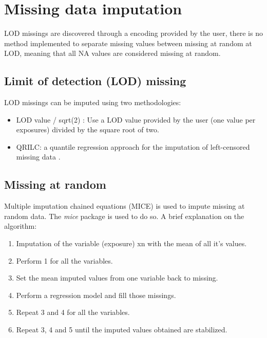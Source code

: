 \documentclass[
]{book}
\providecommand{\tightlist}{%
  \setlength{\itemsep}{0pt}\setlength{\parskip}{0pt}}
\begin{document}
\hypertarget{missing-data-imputation}{%
\section{Missing data imputation}\label{missing-data-imputation}}

LOD missings are discovered through a encoding provided by the user, there is no method implemented to separate missing values between missing at random at LOD, meaning that all NA values are considered missing at random.

\hypertarget{limit-of-detection-lod-missing}{%
\subsection{Limit of detection (LOD) missing}\label{limit-of-detection-lod-missing}}

LOD missings can be imputed using two methodologies:

\begin{itemize}
\tightlist
\item
  LOD value / sqrt(2) : Use a LOD value provided by the user (one value per exposures) divided by the square root of two. \citet{Richardson2003}
\item
  QRILC: a quantile regression approach for the imputation of left-censored missing data \citet{lod_impute}.
\end{itemize}

\hypertarget{missing-at-random}{%
\subsection{Missing at random}\label{missing-at-random}}

Multiple imputation chained equations (MICE) is used to impute missing at random data. The \emph{mice} package is used to do so. A brief explanation on the algorithm:

\begin{enumerate}
\def\labelenumi{\arabic{enumi}.}
\tightlist
\item
  Imputation of the variable (exposure) xn with the mean of all it's values.
\item
  Perform 1 for all the variables.
\item
  Set the mean imputed values from one variable back to missing.
\item
  Perform a regression model and fill those missings.
\item
  Repeat 3 and 4 for all the variables.
\item
  Repeat 3, 4 and 5 until the imputed values obtained are stabilized.
\end{enumerate}
\end{document}
